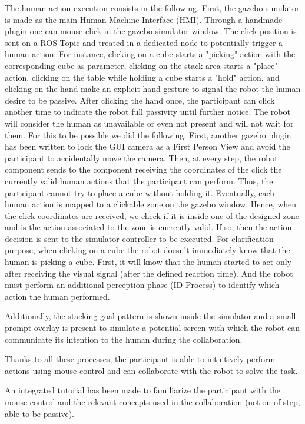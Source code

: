The human action execution consists in the following. First, the gazebo simulator is made as the main Human-Machine Interface (HMI). Through a handmade plugin one can mouse click in the gazebo simulator window. The click position is sent on a ROS Topic and treated in a dedicated node to potentially trigger a human action. For instance, clicking on a cube starts a "picking" action with the corresponding cube as parameter, clicking on the stack area starts a "place" action, clicking on the table while holding a cube starts a "hold" action, and clicking on the hand make an explicit hand gesture to signal the robot the human desire to be passive. After clicking the hand once, the participant can click another time to indicate the robot full passivity until further notice. The robot will consider the human as unavailable or even not present and will not wait for them. 
For this to be possible we did the following. First, another gazebo plugin has been written to lock the GUI camera as a First Person View and avoid the participant to accidentally move the camera.
Then, at every step, the robot component sends to the component receiving the coordinates of the click the currently valid human actions that the participant can perform. Thus, the participant cannot try to place a cube without holding it. Eventually, each human action is mapped to a clickable zone on the gazebo window. Hence, when the click coordinates are received, we check if it is inside one of the designed zone and is the action associated to the zone is currently valid. If so, then the action decision is sent to the simulator controller to be executed. 
For clarification purpose, when clicking on a cube the robot doesn't immediately know that the human is picking a cube. First, it will know that the human started to act only after receiving the visual signal (after the defined reaction time). And the robot must perform an additional perception phase (ID Process) to identify which action the human performed. 

Additionally, the stacking goal pattern is shown inside the simulator and a small prompt overlay is present to simulate a potential screen with which the robot can communicate its intention to the human during the collaboration. 

Thanks to all these processes, the participant is able to intuitively perform actions using mouse control and can collaborate with the robot to solve the task.

An integrated tutorial has been made to familiarize the participant with the mouse control and the relevant concepts used in the collaboration (notion of step, able to be passive). 

